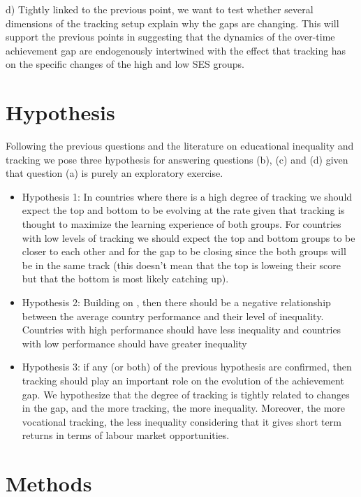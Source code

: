 \documentclass[11pt, a4paper]{article}\usepackage[]{graphicx}\usepackage[]{color}
\begin{document}
d) Tightly linked to the previous point, we want to test whether several dimensions of the tracking setup explain why the gaps are changing. This will support the previous points in suggesting that the dynamics of the over-time achievement gap are endogenously intertwined with the effect that tracking has on the specific changes of the high and low SES groups.

\section{Hypothesis}

Following the previous questions and the literature on educational inequality and tracking we pose three hypothesis for answering questions (b), (c) and (d) given that question (a) is purely an exploratory exercise.

\begin{itemize}
\item Hypothesis 1: In countries where there is a high degree of tracking we should expect the top and bottom to be evolving at the rate given that tracking is thought to maximize the learning experience of both groups. For countries with low levels of tracking we should expect the top and bottom groups to be closer to each other and for the gap to be closing since the both groups will be in the same track (this doesn't mean that the top is loweing their score but that the bottom is most likely catching up).

\item Hypothesis 2: Building on \citet{werfhorst_mijs}, then there should be a negative relationship between the average country performance and their level of inequality. Countries with high performance should have less inequality and countries with low performance should have greater inequality

\item Hypothesis 3: if any (or both) of the previous hypothesis are confirmed, then tracking should play an important role on the evolution of the achievement gap. We hypothesize that the degree of tracking is tightly related to changes in the gap, and the more tracking, the more inequality. Moreover, the more vocational tracking, the less inequality considering that it gives short term returns in terms of labour market opportunities.
\end{itemize}

\section{Methods}
\end{document}
